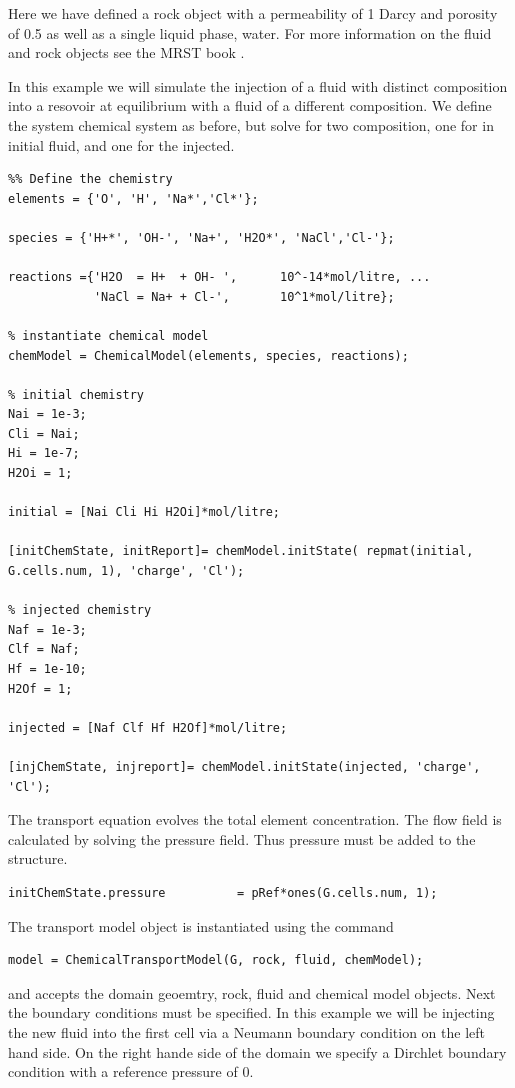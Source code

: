 \documentclass{article}
\begin{document}
Here we have defined a rock object with a permeability of 1 Darcy and porosity of 0.5 as well as a single liquid phase, water. For more information on the fluid and rock objects see the MRST book \cite{lie2014}.

In this example we will simulate the injection of a fluid with distinct composition into a resovoir at equilibrium with a fluid of a different composition. We define the system chemical system as before, but solve for two composition, one for in initial fluid, and one for the injected. 

\begin{lstlisting}
%% Define the chemistry
elements = {'O', 'H', 'Na*','Cl*'};

species = {'H+*', 'OH-', 'Na+', 'H2O*', 'NaCl','Cl-'};

reactions ={'H2O  = H+  + OH- ',      10^-14*mol/litre, ... 
            'NaCl = Na+ + Cl-',       10^1*mol/litre};

% instantiate chemical model
chemModel = ChemicalModel(elements, species, reactions);

% initial chemistry
Nai = 1e-3;
Cli = Nai;
Hi = 1e-7;
H2Oi = 1;

initial = [Nai Cli Hi H2Oi]*mol/litre;

[initChemState, initReport]= chemModel.initState( repmat(initial, G.cells.num, 1), 'charge', 'Cl');

% injected chemistry
Naf = 1e-3;
Clf = Naf;
Hf = 1e-10;
H2Of = 1;

injected = [Naf Clf Hf H2Of]*mol/litre;

[injChemState, injreport]= chemModel.initState(injected, 'charge', 'Cl');
\end{lstlisting}

The transport equation evolves the total element concentration. The flow field is calculated by solving the pressure field. Thus pressure must be added to the  structure.
\begin{lstlisting}
initChemState.pressure          = pRef*ones(G.cells.num, 1);
\end{lstlisting}

The transport model object is instantiated using the  command

\begin{lstlisting}
model = ChemicalTransportModel(G, rock, fluid, chemModel);
\end{lstlisting}

and accepts the domain geoemtry, rock, fluid and chemical model objects. Next the boundary conditions must be specified. In this example we will be injecting the new fluid into the first cell via a Neumann boundary condition on the left hand side. On the right hande side of the domain we specify a Dirchlet boundary condition with a reference pressure of 0.
\end{document}
